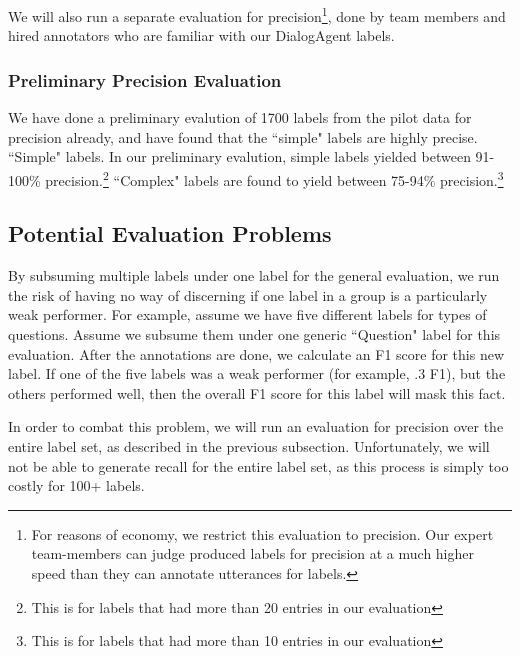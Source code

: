 We will also run a separate evaluation for precision\footnote{For reasons of
economy, we restrict this evaluation to precision. Our expert team-members can
judge produced labels for precision at a much higher speed than they can
annotate utterances for labels.}, done by team members and hired annotators who
are familiar with our DialogAgent labels.


\subsubsection{Preliminary Precision Evaluation} 
\label{subsec:rule_evaluation}

We have done a preliminary evalution of 1700 labels from the pilot data for
precision already, and have found that the ``simple" labels are highly precise.
``Simple" labels. In our preliminary evalution, simple labels yielded between
91-100\% precision.\footnote{This is for labels that had more than 20 entries
in our evaluation} ``Complex" labels are found to yield between 75-94\%
precision.\footnote{This is for labels that had more than 10 entries in our
evaluation}

\subsection{Potential Evaluation Problems}

By subsuming multiple labels under one label for the general evaluation, we run
the risk of having no way of discerning if one label in a group is a
particularly weak performer. For example, assume we have five different labels
for types of questions. Assume we subsume them under one generic ``Question"
label for this evaluation. After the annotations are done, we calculate an F1
score for this new label. If one of the five labels was a weak performer (for
example, .3 F1), but the others performed well, then the overall F1 score for
this label will mask this fact. 

In order to combat this problem, we will run an evaluation for precision over
the entire label set, as described in the previous subsection. Unfortunately,
we will not be able to generate recall for the entire label set, as this
process is simply too costly for 100+ labels.

